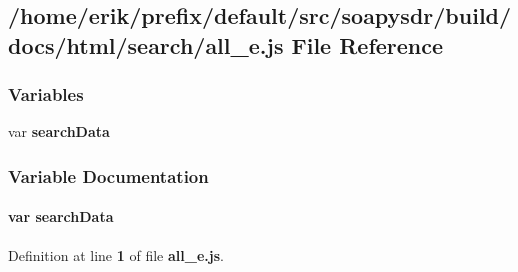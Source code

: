 \subsection{/home/erik/prefix/default/src/soapysdr/build/docs/html/search/all\+\_\+e.js File Reference}
\label{all__e_8js}
\subsubsection*{Variables}
\begin{DoxyCompactItemize}
\item 
var {\bf search\+Data}
\end{DoxyCompactItemize}


\subsubsection{Variable Documentation}
\paragraph[{search\+Data}]{\setlength{\rightskip}{0pt plus 5cm}var search\+Data}\label{all__e_8js_ad01a7523f103d6242ef9b0451861231e}


Definition at line {\bf 1} of file {\bf all\+\_\+e.\+js}.

